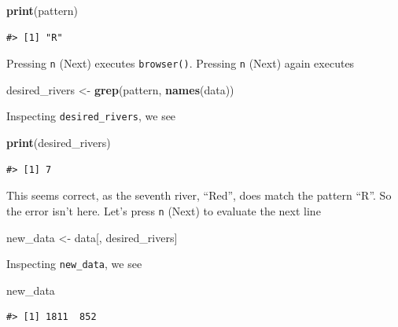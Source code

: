\documentclass[
]{book}
\newenvironment{Shaded}{\begin{snugshade}}{\end{snugshade}}
\newcommand{\KeywordTok}[1]{\textcolor[rgb]{0.13,0.29,0.53}{\textbf{#1}}}
\newcommand{\NormalTok}[1]{#1}
\newcommand{\StringTok}[1]{\textcolor[rgb]{0.31,0.60,0.02}{#1}}
\begin{document}
\begin{Shaded}
\begin{Highlighting}[]
\KeywordTok{print}\NormalTok{(pattern)}
\end{Highlighting}
\end{Shaded}

\begin{verbatim}
#> [1] "R"
\end{verbatim}

Pressing \texttt{n} (Next) executes \texttt{browser()}. Pressing \texttt{n} (Next) again executes

\begin{Shaded}
\begin{Highlighting}[]
\NormalTok{desired_rivers <-}\StringTok{ }\KeywordTok{grep}\NormalTok{(pattern, }\KeywordTok{names}\NormalTok{(data))}
\end{Highlighting}
\end{Shaded}

Inspecting \texttt{desired\_rivers}, we see

\begin{Shaded}
\begin{Highlighting}[]
\KeywordTok{print}\NormalTok{(desired_rivers)}
\end{Highlighting}
\end{Shaded}

\begin{verbatim}
#> [1] 7
\end{verbatim}

This seems correct, as the seventh river, ``Red'', does match the pattern ``R''. So the error isn't here. Let's press \texttt{n} (Next) to evaluate the next line

\begin{Shaded}
\begin{Highlighting}[]
\NormalTok{new_data <-}\StringTok{ }\NormalTok{data[, desired_rivers]}
\end{Highlighting}
\end{Shaded}

Inspecting \texttt{new\_data}, we see

\begin{Shaded}
\begin{Highlighting}[]
\NormalTok{new_data}
\end{Highlighting}
\end{Shaded}

\begin{verbatim}
#> [1] 1811  852
\end{verbatim}
\end{document}
